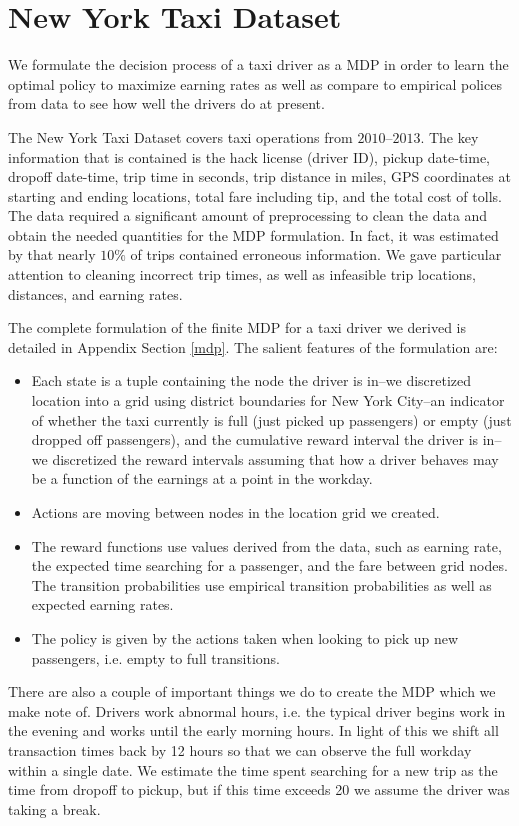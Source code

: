 \documentclass{article}
\begin{document}
\section{New York Taxi Dataset}\label{sec:taxi}
We formulate the decision process of a taxi driver as a MDP in order to learn the optimal policy to maximize earning rates as well as compare to empirical polices from data to see how well the drivers do at present.

The New York Taxi Dataset covers taxi operations from $2010$--$2013$. The key information that is contained is the hack license (driver ID), pickup date-time, dropoff date-time, trip time in seconds, trip distance in miles, GPS coordinates at starting and ending locations, total fare including tip, and the total cost of tolls. The data required a significant amount of preprocessing to clean the data and obtain the needed quantities for the MDP formulation. In fact, it was estimated by \cite{donovan2014new} that nearly $10\%$ of trips contained erroneous information. We gave particular attention to cleaning incorrect trip times, as well as infeasible trip locations, distances, and earning rates.


The complete formulation of the finite MDP for a taxi driver we derived is detailed in Appendix Section \ref{mdp}. The salient features of the formulation are:
\begin{itemize}
\item Each state is a tuple containing the node the driver is in--we discretized location into a grid using district boundaries for New York City--an indicator of whether the taxi currently is full (just picked up passengers) or empty (just dropped off passengers), and the cumulative reward interval the driver is in--we discretized the reward intervals assuming that how a driver behaves may be a function of the earnings at a point in the workday.
\item Actions are moving between nodes in the location grid we created.
\item The reward functions use values derived from the data, such as earning rate, the expected time searching for a passenger, and the fare between grid nodes. The transition probabilities use empirical transition probabilities as well as expected earning rates. 
\item The policy is given by the actions taken when looking to pick up new passengers, i.e. empty to full transitions.
\end{itemize} 

There are also a couple of important things we do to create the MDP which we make note of. Drivers work abnormal hours, i.e. the typical driver begins work in the evening and works until the early morning hours. In light of this we shift all transaction times back by 12 hours so that we can observe the full workday within a single date. We estimate the time spent searching for a new trip as the time from dropoff to pickup, but if this time exceeds 20 we assume the driver was taking a break.
\end{document}
